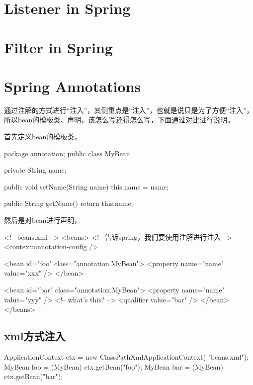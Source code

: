 \documentclass[a4paper,11pt]{article}
\begin{document}
\section[Listener in Spring]{Listener in Spring}
\label{sec:listener}

\section[Filter in Spring]{Filter in Spring}
\label{sec:filter}


\section[Spring Annotations]{Spring Annotations}
通过注解的方式进行“注入”，其侧重点是“注入”，也就是说只是为了方便“注入”，
所以bean的模板类、声明，该怎么写还得怎么写，下面通过对比进行说明。

首先定义bean的模板类，

\begin{javacode}
package annotation;
public class MyBean {
  private String name;

  public void setName(String name) {
    this.name = name;
  }

  public String getName() {
    return this.name;
  }
}
\end{javacode}

然后是对bean进行声明，

\begin{xmlcode}
  <!-- beans.xml -->
  <beans>
    <!-- 告诉spring，我们要使用注解进行注入 -->
    <context:annotation-config />

    <bean id="foo" class="annotation.MyBean">
      <property name="name" value="xxx" />
    </bean>

    <bean id="bar" class="annotation.MyBean">
      <property name="name" value="yyy" />
      <!-- what's this? -->
      <qualifier value="bar" />
    </bean>
  </beans>
\end{xmlcode}

\subsection[xml方式注入]{xml方式注入}
\begin{javacode}
  ApplicationContext ctx = new ClassPathXmlApplicationContext(
                           "beans.xml");
  MyBean foo = (MyBean) ctx.getBean("foo");
  MyBean bar = (MyBean) ctx.getBean("bar");
\end{javacode}
\end{document}

